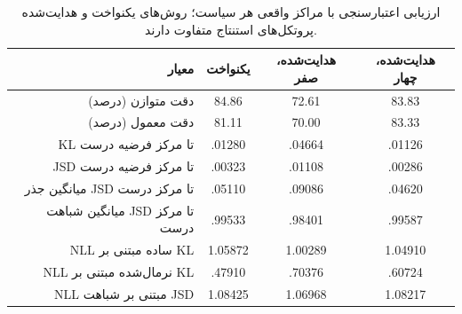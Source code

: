 \begin{table}[htbp]
\centering\small
\caption{ارزیابی اعتبارسنجی با مراکز واقعی هر سیاست؛ روش‌های یکنواخت و هدایت‌شده پروتکل‌های استنتاج متفاوت دارند.}
\label{tab:ch4-center-observation-validation}
\begin{tabular}{rccc}\hline
معیار & یکنواخت & هدایت‌شده، صفر & هدایت‌شده، چهار\\\hline
دقت متوازن (درصد) & 84.86 & 72.61 & 83.83\\
دقت معمول (درصد) & 81.11 & 70.00 & 83.33\\
KL تا مرکز فرضیه درست & .01280 & .04664 & .01126\\
JSD تا مرکز فرضیه درست & .00323 & .01108 & .00286\\
میانگین جذر JSD تا مرکز درست & .05110 & .09086 & .04620\\
میانگین شباهت JSD تا مرکز درست & .99533 & .98401 & .99587\\
NLL ساده مبتنی بر KL & 1.05872 & 1.00289 & 1.04910\\
NLL نرمال‌شده مبتنی بر KL & .47910 & .70376 & .60724\\
NLL مبتنی بر شباهت JSD & 1.08425 & 1.06968 & 1.08217\\\hline
\end{tabular}
\end{table}

